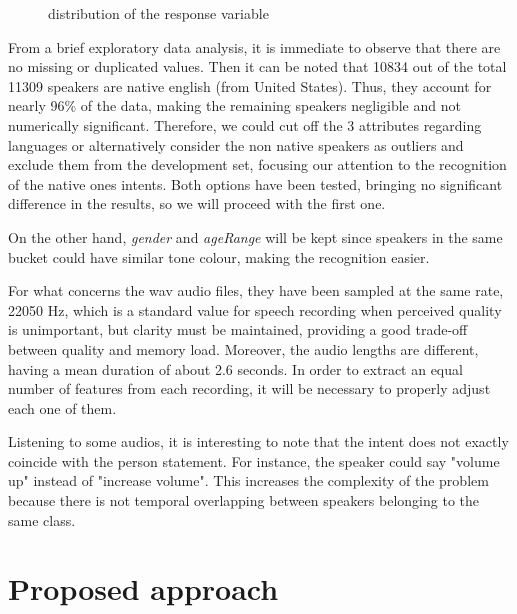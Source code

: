 \documentclass[conference]{IEEEtran}
\begin{document}
\begin{figure}
    \centering
    
    \caption{distribution of the response variable}
    \label{fig:intent}
\end{figure}

From a brief exploratory data analysis, it is immediate to observe that there are no missing or duplicated values. 
Then it can be noted that 10834 out of the total 11309 speakers are native english (from United States).
Thus, they account for nearly 96\% of the data, making the remaining speakers negligible and not numerically significant.
Therefore, we could cut off the 3 attributes regarding languages or alternatively consider the non native speakers as outliers and exclude them from the development set, focusing our attention to the recognition of the native ones intents.
Both options have been tested, bringing no significant difference in the results, so we will proceed with the first one.

On the other hand, \textit{gender} and \textit{ageRange} will be kept since speakers in the same bucket could have similar tone colour, making the recognition easier.

For what concerns the wav audio files, they have been sampled at the same rate, 22050 Hz, which is a standard value for speech recording when perceived quality is unimportant, but clarity must be maintained, providing a good trade-off between quality and memory load.
Moreover, the audio lengths are different, having a mean duration of about 2.6 seconds.
In order to extract an equal number of features from each recording, it will be necessary to properly adjust each one of them. 

Listening to some audios, it is interesting to note that the intent does not exactly coincide with the person statement.
For instance, the speaker could say "volume up" instead of "increase volume".
This increases the complexity of the problem because there is not temporal overlapping between speakers belonging to the same class.

\section{Proposed approach}
\end{document}
